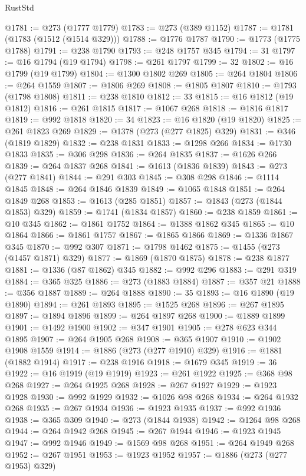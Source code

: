 \begin{lexlean}{RustStd}
\begin{coremodule}
{\begin{coremodule}
{{{{{{{{{{{{{{{{{{{{{{{{{{{{{{{{{{{{{{{{{{{{{{{{{{{{{{{{{{{{{{{{{{{{{{{{{{{{{{{{{{{{{@1781 := @273 (@1777 @1779)
@1783 := @273 (@389 @1152)
@1787 := @1781 (@1783 (@1512 (@1514 @329)))
@1788 := @1776 @1787
@1790 := @1773 (@1775 @1788)
@1791 := @238 @1790
@1793 := @248 @1757 @345
@1794 := 31
@1797 := @16 @1794 (@19 @1794)
@1798 := @261 @1797
@1799 := 32
@1802 := @16 @1799 (@19 @1799)
@1804 := @1300 @1802 @269
@1805 := @264 @1804
@1806 := @264 @1559
@1807 := @1806 @269
@1808 := @1805 @1807
@1810 := @1793 (@1798 @1808)
@1811 := @238 @1810
@1812 := 33
@1815 := @16 @1812 (@19 @1812)
@1816 := @261 @1815
@1817 := @1067 @268
@1818 := @1816 @1817
@1819 := @992 @1818
@1820 := 34
@1823 := @16 @1820 (@19 @1820)
@1825 := @261 @1823 @269
@1829 := @1378 (@273 (@277 @1825) @329)
@1831 := @346 (@1819 @1829)
@1832 := @238 @1831
@1833 := @1298 @266
@1834 := @1730 @1833
@1835 := @306 @298
@1836 := @264 @1835
@1837 := @1626 @266
@1839 := @264 @1837 @268
@1841 := @1613 (@1836 @1839)
@1843 := @273 (@277 @1841)
@1844 := @291 @303
@1845 := @308 @298
@1846 := @1114 @1845
@1848 := @264 @1846 @1839
@1849 := @1065 @1848
@1851 := @264 @1849 @268
@1853 := @1613 (@285 @1851)
@1857 := @1843 (@273 (@1844 @1853) @329)
@1859 := @1741 (@1834 @1857)
@1860 := @238 @1859
@1861 := @10 @345
@1862 := @1861 @1752
@1864 := @1388 @1862 @345
@1865 := @10 @1864
@1866 := @1861 @1757
@1867 := @1865 @1866
@1869 := @1336 @1867 @345
@1870 := @992 @307
@1871 := @1798 @1462
@1875 := @1455 (@273 (@1457 @1871) @329)
@1877 := @1869 (@1870 @1875)
@1878 := @238 @1877
@1881 := @1336 (@87 @1862) @345
@1882 := @992 @296
@1883 := @291 @319
@1884 := @365 @325
@1886 := @273 (@1883 @1884)
@1887 := @357 @21
@1888 := @356 @1887
@1889 := @264 @1888
@1890 := 35
@1893 := @16 @1890 (@19 @1890)
@1894 := @261 @1893
@1895 := @1525 @268
@1896 := @267 @1895
@1897 := @1894 @1896
@1899 := @264 @1897 @268
@1900 := @1889 @1899
@1901 := @1492 @1900
@1902 := @347 @1901
@1905 := @278 @623 @344 @1895
@1907 := @264 @1905 @268
@1908 := @365 @1907
@1910 := @1902 @1908 @1559
@1914 := @1886 (@273 (@277 @1910) @329)
@1916 := @1881 (@1882 @1914)
@1917 := @238 @1916
@1918 := @1679 @345
@1919 := 36
@1922 := @16 @1919 (@19 @1919)
@1923 := @261 @1922
@1925 := @368 @98 @268
@1927 := @264 @1925 @268
@1928 := @267 @1927
@1929 := @1923 @1928
@1930 := @992 @1929
@1932 := @1026 @98 @268
@1934 := @264 @1932 @268
@1935 := @267 @1934
@1936 := @1923 @1935
@1937 := @992 @1936
@1938 := @365 @309
@1940 := @273 (@1844 @1938)
@1942 := @1264 @98 @268
@1944 := @264 @1942 @268
@1945 := @267 @1944
@1946 := @1923 @1945
@1947 := @992 @1946
@1949 := @1569 @98 @268
@1951 := @264 @1949 @268
@1952 := @267 @1951
@1953 := @1923 @1952
@1957 := @1886 (@273 (@277 @1953) @329)
}}}}}}}}}}}}}}}}}}}}}}}}}}}}}}}}}}}}}}}}}}}}}}}}}}}}}}}}}}}}}}}}}}}}}}}}}}}}}}}}}}}}}
\end{coremodule}}
\end{coremodule}
\end{lexlean}
